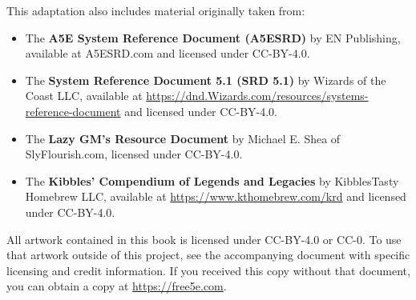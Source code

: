 This adaptation also includes material originally taken from:

\begin{itemize}
\item
  The \textbf{A5E System Reference Document (A5ESRD)} by EN Publishing,
  available at A5ESRD.com and licensed under CC-BY-4.0.
\item
  The \textbf{System Reference Document 5.1 (SRD 5.1)} by Wizards of the
  Coast LLC, available at
  \url{https://dnd.Wizards.com/resources/systems-reference-document} and
  licensed under CC-BY-4.0.
\item
  The \textbf{Lazy GM's Resource Document} by Michael E. Shea of
  SlyFlourish.com, licensed under CC-BY-4.0.
\item
  The \textbf{Kibbles' Compendium of Legends and Legacies} by
  KibblesTasty Homebrew LLC, available at
  \url{https://www.kthomebrew.com/krd} and licensed under CC-BY-4.0.
\end{itemize}

All artwork contained in this book is licensed under CC-BY-4.0 or CC-0.
To use that artwork outside of this project, see the accompanying
document with specific licensing and credit information. If you received
this copy without that document, you can obtain a copy at
\url{https://free5e.com}.
